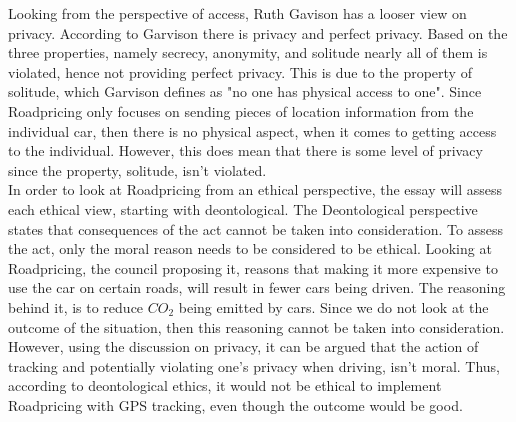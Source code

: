 Looking from the perspective of access, Ruth Gavison has a looser view on privacy. According to Garvison there is privacy and perfect privacy. Based on the three properties, namely secrecy, anonymity, and solitude nearly all of them is violated, hence not providing perfect privacy. This is due to the property of solitude, which Garvison defines as "no one has physical access to one". Since Roadpricing only focuses on sending pieces of location information from the individual car, then there is no physical aspect, when it comes to getting access to the individual. However, this does mean that there is some level of privacy since the property, solitude, isn't violated. \\



\noindent In order to look at Roadpricing from an ethical perspective, the essay will assess each ethical view, starting with deontological. The Deontological perspective states that consequences of the act cannot be taken into consideration. To assess the act, only the moral reason needs to be considered to be ethical. Looking at Roadpricing, the council proposing it, reasons that making it more expensive to use the car on certain roads, will result in fewer cars being driven. The reasoning behind it, is to reduce $CO_2$ being emitted by cars. Since we do not look at the outcome of the situation, then this reasoning cannot be taken into consideration. However, using the discussion on privacy, it can be argued that the action of tracking and potentially violating one's privacy when driving, isn't moral. Thus, according to deontological ethics, it would not be ethical to implement Roadpricing with GPS tracking, even though the outcome would be good.


